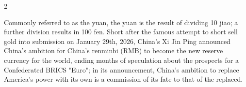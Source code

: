 \documentclass[10pt,a4paper,twoside]{article} %
\begin{document}
\begin{multicols}{2}
{%



\newline \indent Commonly referred to as the yuan, the yuan is the result of dividing 10 jiao; a further division results in 100 fen. Short after the famous attempt to short sell gold into submission on January 29th, 2026, China's Xi Jin Ping announced China's ambition for China's renminbi (RMB) to become the new reserve currency for the world, ending months of speculation about the prospects for a Confederated BRICS "Euro"; in its announcement, China's ambition to replace America's power with its own is a commission of its fate to that of the replaced. 
}


\end{multicols}
\end{document}
